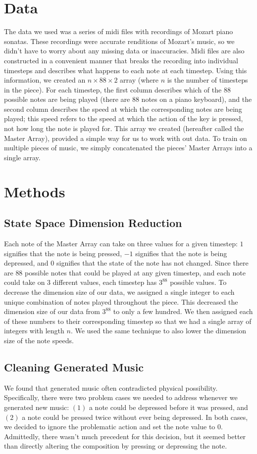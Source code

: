\documentclass[11pt]{article}
\begin{document}
\section{Data}
The data we used was a series of midi files with recordings of
Mozart piano sonatas. These recordings were accurate renditions of
Mozart's music, so we didn't have to worry about any missing data or
inaccuracies. Midi files are also constructed in a convenient manner that
breaks the recording into individual timesteps and describes what happens to 
each note at each timestep. Using this information, we created an $n \times 88 
\times 2$ array (where $n$ is the number of timesteps in the piece). For 
each timestep, the first column describes which of the $88$ possible notes 
are being played (there are 88 notes on a piano keyboard), 
and the second column describes the speed at which the 
corresponding notes are being played; this speed refers to the speed at which
the action of the key is pressed, not how long the note is played for.
This array we created (hereafter called the Master Array), provided a simple
way for us to work with out data. To train on multiple pieces of music, we
simply concatenated the pieces' Master Arrays into a single array.
    
\section{Methods}
\subsection{State Space Dimension Reduction}
Each note of the Master Array can take on three values for a given timestep:
 $1$ signifies that the note is being pressed, $-1$ signifies that the 
note is being depressed, and $0$ signifies that the state of the note has 
not changed. Since there are $88$ possible notes that could be played at any
given timestep, and each note could take on $3$ different values, each
timestep has $3^{88}$ possible values. To decrease the dimension size of
our data, we assigned a single integer to each unique combination of
notes played throughout the piece. This decreased the dimension size of our
data from $3^{88}$ to only a few hundred. We then assigned each of these numbers
to their corresponding timestep so that we had a single array of integers with
length $n$. We used the same technique to also lower the dimension size of
the note speeds.

\subsection{Cleaning Generated Music}
We found that generated music often contradicted physical possibility. Specifically, there were two problem cases we needed to address whenever we generated new music: $(1)$ a note could be depressed before it was pressed, and $(2)$ a note could be pressed twice without ever being depressed.
In both cases, we decided to ignore the problematic action and set the note value to $0$. Admittedly, there wasn't much precedent for this decision, but it seemed better than directly altering the composition by pressing or depressing the note.
\end{document}
